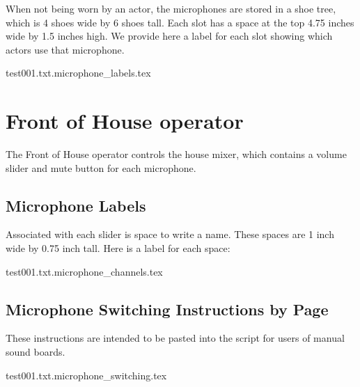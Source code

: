 \documentclass[letterpaper]{article}
\begin{document}
When not being worn by an actor, the microphones are stored in a shoe tree,
which is 4 shoes wide by 6 shoes tall.  
Each slot has a space at the top 4.75 inches wide
by 1.5 inches high.  We provide here a label for each slot showing which
actors use that microphone.

{\Large
 {test001.txt.microphone_labels.tex}
}

\section {Front of House operator}

The Front of House operator controls the house mixer, 
which contains a volume slider
and mute button for each microphone.  

\subsection {Microphone Labels}

Associated with each slider is space to write a name.  
These spaces are 1 inch wide by 0.75 inch tall.  
Here is a label for each space:

{\Large
 {test001.txt.microphone_channels.tex}
}

\subsection {Microphone Switching Instructions by Page}

These instructions are intended to be pasted into the script
for users of manual sound boards.

 {test001.txt.microphone_switching.tex}
\end{document}
